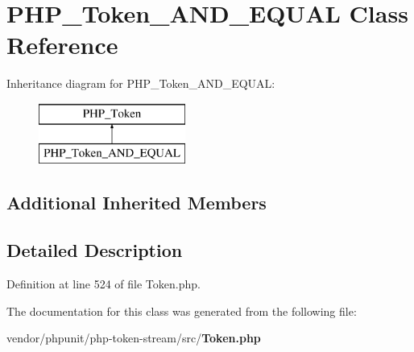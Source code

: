 \section{P\+H\+P\+\_\+\+Token\+\_\+\+A\+N\+D\+\_\+\+E\+Q\+U\+A\+L Class Reference}
\label{class_p_h_p___token___a_n_d___e_q_u_a_l}
Inheritance diagram for P\+H\+P\+\_\+\+Token\+\_\+\+A\+N\+D\+\_\+\+E\+Q\+U\+A\+L\+:\begin{figure}[H]
\begin{center}
\leavevmode
\includegraphics[height=2.000000cm]{class_p_h_p___token___a_n_d___e_q_u_a_l}
\end{center}
\end{figure}
\subsection*{Additional Inherited Members}


\subsection{Detailed Description}


Definition at line 524 of file Token.\+php.



The documentation for this class was generated from the following file\+:\begin{DoxyCompactItemize}
\item 
vendor/phpunit/php-\/token-\/stream/src/{\bf Token.\+php}\end{DoxyCompactItemize}
